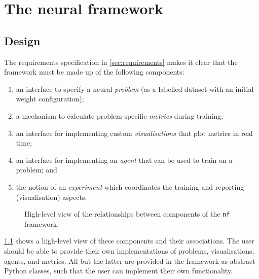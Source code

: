 \chapter{The neural framework}
\label{chap:framework}

\section{Design}
The requirements specification in \ref{sec:requirements} makes it clear that the framework must be made up of the following components:
\begin{enumerate}
    \item an interface to specify a neural \textit{problem} (as a labelled dataset with an initial weight configuration);
    \item a mechanism to calculate problem-specific \textit{metrics} during training;
    \item an interface for implementing custom \textit{visualisations} that plot metrics in real time;
    \item an interface for implementing an \textit{agent} that can be used to train on a problem; and
    \item the notion of an \textit{experiment} which coordinates the training and reporting (visualisation) aspects.
\end{enumerate}
\begin{figure}
    \centering
    \caption{High-level view of the relationships between components of the \texttt{nf} framework.}
    \label{fig:nf_components}
\end{figure}
\ref{fig:nf_components} shows a high-level view of these components and their associations. 
The user should be able to provide their own implementations of problems, visualisations, agents, and metrics. 
All but the latter are provided in the framework as abstract Python classes, such that the user can implement their own functionality.

